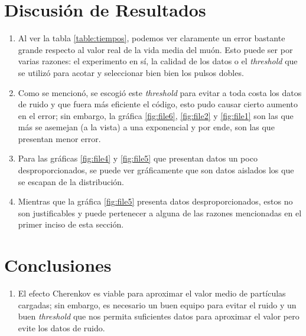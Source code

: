 \documentclass[conference]{IEEEtran}
\begin{document}
\section{Discusión de Resultados}
\begin{enumerate}
    \item Al ver la tabla \ref{table:tiempos}, podemos ver claramente un error bastante grande respecto al valor real de la vida media del muón. Esto puede ser por varias razones: el experimento en sí, la calidad de los datos o el \textit{threshold} que se utilizó para acotar y seleccionar bien bien los pulsos dobles. 
    \item Como se mencionó, se escogió este \textit{threshold} para evitar a toda costa los datos de ruido y que fuera más eficiente el código, esto pudo causar cierto aumento en el error; sin embargo, la gráfica \ref{fig:file6}, \ref{fig:file2} y \ref{fig:file1} son las que más se asemejan (a la vista) a una exponencial y por ende, son las que presentan menor error.
	\item Para las gráficas \ref{fig:file4} y \ref{fig:file5} que presentan datos un poco desproporcionados, se puede ver gráficamente que son datos aislados los que se escapan de la distribución.
	\item Mientras que la gráfica \ref{fig:file5} presenta datos desproporcionados, estos no son justificables y puede pertenecer a alguna de las razones mencionadas en el primer inciso de esta sección.
\end{enumerate}



\section{Conclusiones}
\begin{enumerate}
    \item El efecto Cherenkov es viable para aproximar el valor medio de partículas cargadas; sin embargo, es necesario un buen equipo para evitar el ruido y un buen \textit{threshold} que nos permita suficientes datos para aproximar el valor pero evite los datos de ruido.
\end{enumerate}
\end{document}
